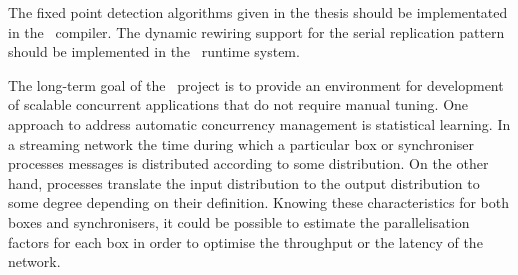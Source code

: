 The fixed point detection algorithms given in the thesis should be implementated in the \ak\ compiler. The dynamic rewiring support for the serial replication pattern should be implemented in the \ak\ runtime system.

The long-term goal of the \ak\ project is to provide an environment for development of scalable concurrent applications that do not require manual tuning. One approach to address automatic concurrency management is statistical learning. In a streaming network the time during which a particular box or synchroniser processes messages is distributed according to some distribution. On the other hand, processes translate the input distribution to the output distribution to some degree depending on their definition. Knowing these characteristics for both boxes and synchronisers, it could be possible to estimate the parallelisation factors for each box in order to optimise the throughput or the latency of the network.
